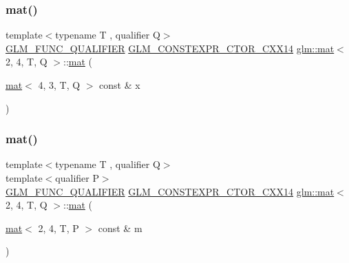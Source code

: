 \mbox{\label{structglm_1_1mat_3_012_00_014_00_01_t_00_01_q_01_4_addaf64b8bf06e6485613afe876a4f4ac}} 
\subsubsection{\texorpdfstring{mat()}{mat()}\hspace{0.1cm}{\footnotesize\ttfamily [17/21]}}
{\footnotesize\ttfamily template$<$typename T , qualifier Q$>$ \\
\hyperlink{setup_8hpp_a33fdea6f91c5f834105f7415e2a64407}{G\+L\+M\+\_\+\+F\+U\+N\+C\+\_\+\+Q\+U\+A\+L\+I\+F\+I\+ER} \hyperlink{setup_8hpp_a0900f9145e68bf6061b6f5e7be3fa751}{G\+L\+M\+\_\+\+C\+O\+N\+S\+T\+E\+X\+P\+R\+\_\+\+C\+T\+O\+R\+\_\+\+C\+X\+X14} \hyperlink{structglm_1_1mat}{glm\+::mat}$<$ 2, 4, T, Q $>$\+::\hyperlink{structglm_1_1mat}{mat} (\begin{DoxyParamCaption}\item[{\hyperlink{structglm_1_1mat}{mat}$<$ 4, 3, T, Q $>$ const \&}]{x }\end{DoxyParamCaption})}

\mbox{\label{structglm_1_1mat_3_012_00_014_00_01_t_00_01_q_01_4_a20ea2b3c9367a0ab927a96a1b37cf119}} 
\subsubsection{\texorpdfstring{mat()}{mat()}\hspace{0.1cm}{\footnotesize\ttfamily [18/21]}}
{\footnotesize\ttfamily template$<$typename T , qualifier Q$>$ \\
template$<$qualifier P$>$ \\
\hyperlink{setup_8hpp_a33fdea6f91c5f834105f7415e2a64407}{G\+L\+M\+\_\+\+F\+U\+N\+C\+\_\+\+Q\+U\+A\+L\+I\+F\+I\+ER} \hyperlink{setup_8hpp_a0900f9145e68bf6061b6f5e7be3fa751}{G\+L\+M\+\_\+\+C\+O\+N\+S\+T\+E\+X\+P\+R\+\_\+\+C\+T\+O\+R\+\_\+\+C\+X\+X14} \hyperlink{structglm_1_1mat}{glm\+::mat}$<$ 2, 4, T, Q $>$\+::\hyperlink{structglm_1_1mat}{mat} (\begin{DoxyParamCaption}\item[{\hyperlink{structglm_1_1mat}{mat}$<$ 2, 4, T, P $>$ const \&}]{m }\end{DoxyParamCaption})}



